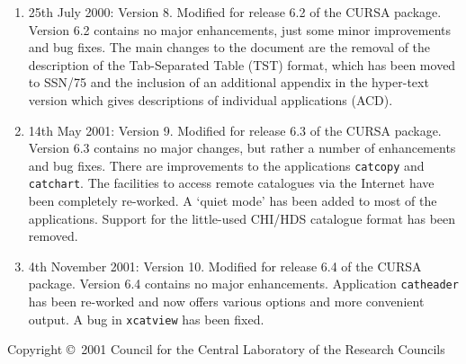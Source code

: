 \documentclass[twoside,11pt]{article}
\newcommand{\stardoccopyright}
{Copyright \copyright\ 2001 Council for the Central Laboratory of the Research Councils}
\newcommand{\htmladdnormallink}[2]{#1}
\newcommand{\xref}[3]{#1}
\renewcommand{\_}{\texttt{\symbol{95}}}
\begin{document}
\begin{enumerate}
  \item 25th July 2000: Version 8.
   Modified for \htmladdnormallink{release 6.2}
   {http://www.roe.ac.uk/acdwww/cursa/news/v6_2.lis} of the CURSA package.
   Version 6.2 contains no major enhancements, just some minor improvements
   and bug fixes.  The main changes to the document are the removal of the
   description of the Tab-Separated Table (TST) format, which has been
   moved to \xref{SSN/75}{ssn75}{} and the inclusion of an additional
   appendix in the hyper-text version which gives descriptions of individual
   applications (ACD).

  \item 14th May 2001: Version 9.
   Modified for \htmladdnormallink{release 6.3}
   {http://www.roe.ac.uk/acdwww/cursa/news/v6_3.lis} of the CURSA package.
   Version 6.3 contains no major changes, but rather a number of
   enhancements and bug fixes.  There are improvements to the applications
   {\tt catcopy} and {\tt catchart}.  The facilities to access remote
   catalogues via the Internet have been completely re-worked.  A `quiet
   mode' has been added to most of the applications.  Support for the
   little-used CHI/HDS catalogue format has been removed.

  \item 4th November 2001: Version 10.
   Modified for \htmladdnormallink{release 6.4}
   {http://www.roe.ac.uk/acdwww/cursa/news/v6_4.lis} of the CURSA package.
   Version 6.4 contains no major enhancements.  Application {\tt catheader}
   has been re-worked and now offers various options and more convenient
   output.  A bug in {\tt xcatview} has been fixed.

\end{enumerate}

\vspace*{\fill}
\stardoccopyright
\end{document}
